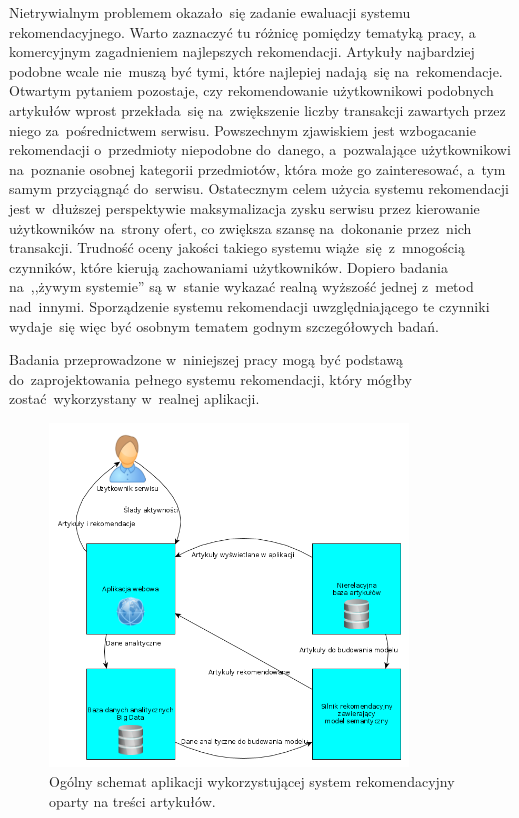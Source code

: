 \documentclass[pl]{minipw} %
\begin{document}
Nietrywialnym problemem okazało~się zadanie ewaluacji systemu rekomendacyjnego. Warto zaznaczyć tu różnicę pomiędzy tematyką pracy, a komercyjnym zagadnieniem najlepszych rekomendacji. Artykuły najbardziej podobne wcale nie~muszą być tymi, które najlepiej nadają~się na~rekomendacje. Otwartym pytaniem pozostaje, czy rekomendowanie użytkownikowi podobnych artykułów wprost przekłada~się na~zwiększenie liczby transakcji zawartych przez niego za~pośrednictwem serwisu. Powszechnym zjawiskiem jest wzbogacanie rekomendacji o~przedmioty niepodobne do~danego, a~pozwalające użytkownikowi na~poznanie osobnej kategorii przedmiotów, która może go zainteresować, a~tym samym przyciągnąć do~serwisu. Ostatecznym celem użycia systemu rekomendacji jest w~dłuższej perspektywie maksymalizacja zysku serwisu przez kierowanie użytkowników na~strony ofert, co zwiększa szansę na~dokonanie przez~nich transakcji. Trudność oceny jakości takiego systemu wiąże~się z~mnogością czynników, które kierują zachowaniami użytkowników. Dopiero badania na~,,żywym systemie'' są w~stanie wykazać realną wyższość jednej z~metod nad~innymi. Sporządzenie systemu rekomendacji uwzględniającego te czynniki wydaje~się więc być osobnym tematem godnym szczegółowych badań.

Badania przeprowadzone w~niniejszej pracy mogą być podstawą do~zaprojektowania pełnego systemu rekomendacji, który mógłby zostać wykorzystany w~realnej aplikacji.
\begin{figure}[H]
	\centering
	\includegraphics[width=0.85\textwidth]{img/recom_sys_schema.png}
	\caption{Ogólny schemat aplikacji wykorzystującej system rekomendacyjny oparty na treści artykułów.}
\end{figure}
\end{document}
